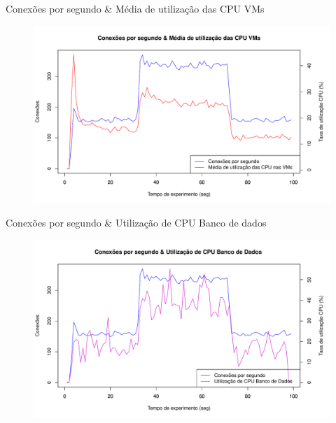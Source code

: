 
\begin{frame}{Conexões por segundo \& Média de utilização das CPU VMs}
	\begin{figure}[htb]
		\centering
		\includegraphics[scale=0.45]{../monograph/images/cps-vmcpu60.pdf}
		\label{fig:cps-vmcpu60}
	\end{figure}
\end{frame}

\begin{frame}{Conexões por segundo \& Utilização de CPU Banco de dados}
	\begin{figure}[htb]
		\centering
		\includegraphics[scale=0.45]{../monograph/images/cps-dbcpu60.pdf}
		\label{fig:cps-dbcpu60}
	\end{figure}
\end{frame}

